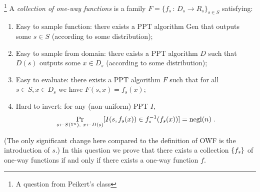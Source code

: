 \begin{questions}



    \question\footnote{A question from Peikert's class\label{fn:peikert}} 
		A \emph{collection of one-way functions} is a family $F=\{f_s\,:\, D_s \to R_s\}_{s \in S}$
		satisfying:
		\begin{enumerate}
		\item Easy to sample function: there exists a PPT algorithm Gen that outputs some $s \in S$ (according to some distribution);
		\item Easy to sample from domain: there exists a PPT algorithm $D$ such that $D(s)$ outputs some $x \in D_s$ (according to some distribution);
		\item Easy to evaluate: there exists a PPT algorithm $F$ such that for all $s\in S, x \in D_s$ we have $F(s,x)=f_s(x)$;
		\item Hard to invert: for any (non-uniform) PPT $I$,
		\[
		\Pr_{s \leftarrow S(1^n),~x \leftarrow D(s)}[I(s,f_s(x)) \in f_s^{-1}(f_s(x))] = \operatorname{negl}(n) \; .
		\]
		\end{enumerate}
		(The only significant change here compared to the definition of OWF is the introduction of $s$.)
    In this question we prove that there exists a collection $\{{f_{s}}\}$ of
    one-way functions if and only if there exists a one-way function
    $f$.  		
\end{questions}
